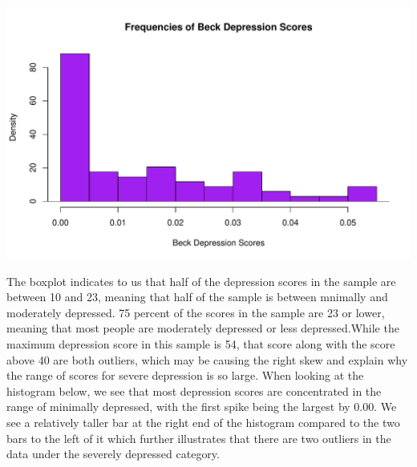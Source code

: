 \documentclass{article}
\begin{document}
\begin{enumerate}
\includegraphics{HW0-016}

The boxplot indicates to us that half of the depression scores in the sample are between 10 and 23, meaning that half of the sample is between mnimally and moderately depressed. 75 percent of the scores in the sample are 23 or lower, meaning that most people are moderately depressed or less depressed.While the maximum depression score in this sample is 54, that score along with the score above 40 are both outliers, which may be causing the right skew and explain why the range of scores for severe depression is so large. When looking at the histogram below, we see that most depression scores are concentrated in the range of minimally depressed, with the first spike being the largest by 0.00. We see a relatively taller bar at the right end of the histogram compared to the two bars to the left of it which further illustrates that there are two outliers in the data under the severely depressed category. 

\begin{Schunk}
\end{Schunk}

\begin{Schunk}
\end{Schunk}


\end{enumerate}
\end{document}
